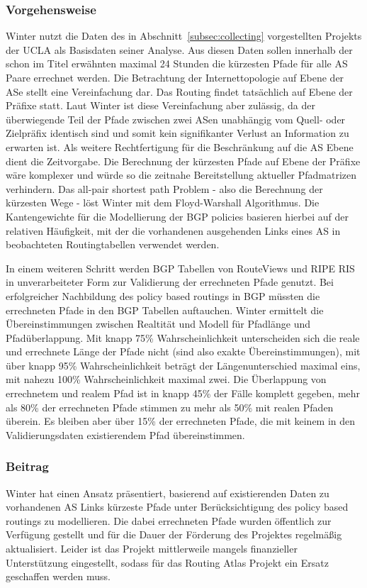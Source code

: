 \subsubsection{Vorgehensweise}
Winter nutzt die Daten des in Abschnitt~\ref{subsec:collecting} vorgestellten Projekts der UCLA als Basisdaten seiner Analyse.
Aus diesen Daten sollen innerhalb der schon im Titel erwähnten maximal 24 Stunden die kürzesten Pfade für alle AS Paare errechnet werden.
Die Betrachtung der Internettopologie auf Ebene der ASe stellt eine Vereinfachung dar.
Das Routing findet tatsächlich auf Ebene der Präfixe statt.
Laut Winter ist diese Vereinfachung aber zulässig, da der überwiegende Teil der Pfade zwischen zwei ASen unabhängig vom Quell- oder Zielpräfix identisch sind und somit kein signifikanter Verlust an Information zu erwarten ist.
Als weitere Rechtfertigung für die Beschränkung auf die AS Ebene dient die Zeitvorgabe.
Die Berechnung der kürzesten Pfade auf Ebene der Präfixe wäre komplexer und würde so die zeitnahe Bereitstellung aktueller Pfadmatrizen verhindern.
Das all-pair shortest path Problem - also die Berechnung der kürzesten Wege - löst Winter mit dem Floyd-Warshall Algorithmus.
Die Kantengewichte für die Modellierung der BGP policies basieren hierbei auf der relativen Häufigkeit, mit der die vorhandenen ausgehenden Links eines AS in beobachteten Routingtabellen verwendet werden.

In einem weiteren Schritt werden BGP Tabellen von RouteViews und RIPE RIS in unverarbeiteter Form zur Validierung der errechneten Pfade genutzt.
Bei erfolgreicher Nachbildung des policy based routings in BGP müssten die errechneten Pfade in den BGP Tabellen auftauchen.
Winter ermittelt die Übereinstimmungen zwischen Realtität und Modell für Pfadlänge und Pfadüberlappung.
Mit knapp 75\% Wahrscheinlichkeit unterscheiden sich die reale und errechnete Länge der Pfade nicht (sind also exakte Übereinstimmungen), mit über knapp 95\% Wahrscheinlichkeit beträgt der Längenunterschied maximal eins, mit nahezu 100\% Wahrscheinlichkeit maximal zwei.
Die Überlappung von errechnetem und realem Pfad ist in knapp 45\% der Fälle komplett gegeben, mehr als 80\% der errechneten Pfade stimmen zu mehr als 50\% mit realen Pfaden überein.
Es bleiben aber über 15\% der errechneten Pfade, die mit keinem in den Validierungsdaten existierendem Pfad übereinstimmen.

\subsubsection{Beitrag}
Winter hat einen Ansatz präsentiert, basierend auf existierenden Daten zu vorhandenen AS Links kürzeste Pfade unter Berücksichtigung des policy based routings zu modellieren.
Die dabei errechneten Pfade wurden öffentlich zur Verfügung gestellt und für die Dauer der Förderung des Projektes regelmäßig aktualisiert.
Leider ist das Projekt mittlerweile mangels finanzieller Unterstützung eingestellt, sodass für das Routing Atlas Projekt ein Ersatz geschaffen werden muss.
